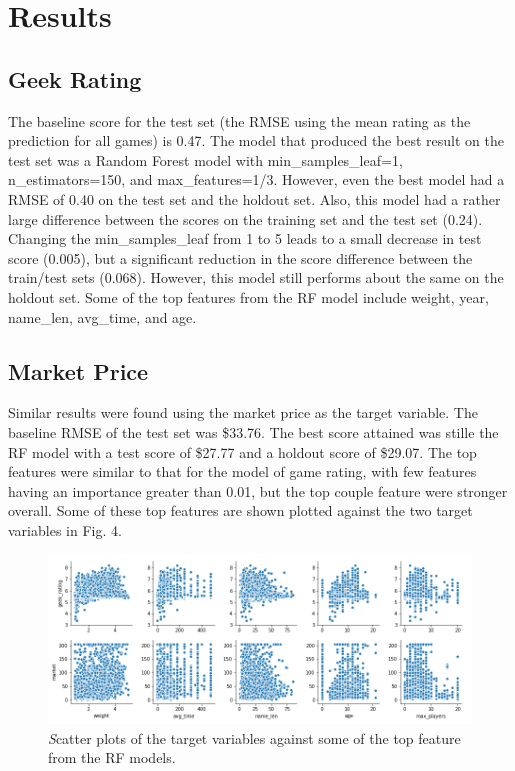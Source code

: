 \documentclass[12pt]{article}
\begin{document}
\section{Results}
\subsection{Geek Rating}
The baseline score for the test set (the RMSE using the mean rating as the prediction for all games) is 0.47. The model that produced the best result on the test set was a Random Forest model with min\_samples\_leaf=1, n\_estimators=150, and max\_features=1/3. However, even the best model had a RMSE of 0.40 on the test set and the holdout set. Also, this model had a rather large difference between the scores on the training set and the test set (0.24). Changing the min\_samples\_leaf from 1 to 5 leads to a small decrease in test score (0.005), but a significant reduction in the score difference between the train/test sets (0.068). However, this model still performs about the same on the holdout set. Some of the top features from the RF model include weight, year, name\_len, avg\_time, and age. 

\subsection{Market Price}
Similar results were found using the market price as the target variable. The baseline RMSE of the test set was \$33.76. The best score attained was stille the RF model with a test score of \$27.77 and a holdout score of \$29.07. The top features were similar to that for the model of game rating, with few features having an importance greater than 0.01, but the top couple feature were stronger overall. Some of these top features are shown plotted against the two target variables in Fig. 4.

\begin{figure}[ht]
\centering
\includegraphics[width=\textwidth]{top_features_targets.png}
\caption{\small \textit Scatter plots of the target variables against some of the top feature from the RF models.}
\end{figure}
\end{document}
